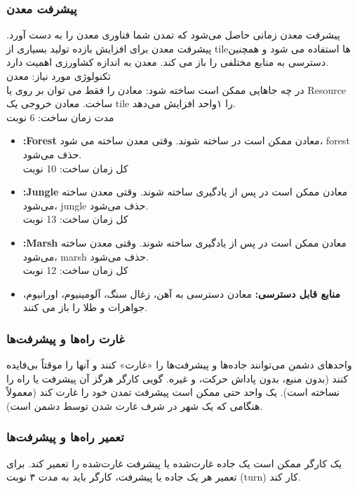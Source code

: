 \documentclass[]{article}
\begin{document}
\subsubsection*{{\titr پیشرفت معدن}}
پیشرفت معدن زمانی حاصل می‌شود که تمدن شما فناوری معدن را به دست آورد. پیشرفت معدن برای افزایش بازده تولید بسیاری از tileها استفاده می شود و همچنین دسترسی به منابع مختلفی را باز می کند. معدن به اندازه کشاورزی اهمیت دارد.\\
تکنولوژی مورد نیاز: معدن\\
در چه جاهایی ممکن است ساخته شود: معادن را فقط می توان بر روی   یا Resource ساخت. معادن خروجی یک tile را ۱واحد افزایش می‌دهد.\\
مدت زمان ساخت: 6 نوبت
\begin{itemize}
	\item \textbf{:Forest}    معادن ممکن است در  ساخته شوند. وقتی معدن ساخته می شود، forest حذف می‌شود.\\
کل زمان ساخت: 10 نوبت

	\item \textbf{:Jungle} معادن ممکن است در  پس از یادگیری  ساخته شوند. وقتی معدن ساخته می‌شود، jungle حذف می‌شود.\\
کل زمان ساخت: 13 نوبت

	\item \textbf{:Marsh} معادن ممکن است در  پس از یادگیری  ساخته شوند. وقتی معدن ساخته می‌شود، marsh حذف می‌شود.\\
کل زمان ساخت: 12 نوبت


	\item \textbf{منابع قابل دسترسی:} معادن دسترسی به آهن، زغال سنگ، آلومینیوم، اورانیوم، جواهرات و طلا را باز می کنند.
\end{itemize}

\subsubsection*{{\titr غارت راه‌ها و پیشرفت‌ها}}
واحدهای دشمن می‌توانند جاده‌ها و پیشرفت‌ها را «غارت» کنند و آنها را موقتاً بی‌فایده کنند (بدون منبع، بدون پاداش حرکت، و غیره. گویی کارگر هرگز آن پیشرفت یا  راه را نساخته است). یک واحد حتی ممکن است پیشرفت تمدن خود را غارت کند (معمولاً هنگامی که یک شهر در شرف غارت شدن توسط دشمن است).

\subsubsection*{{\titr تعمیر راه‌ها و پیشرفت‌ها}}
یک کارگر ممکن است یک جاده غارت‌شده یا پیشرفت غارت‌شده را تعمیر کند. برای تعمیر هر یک جاده یا پیشرفت،
کارگر باید به مدت ۳ نوبت (turn) کار کند.
\end{document}

